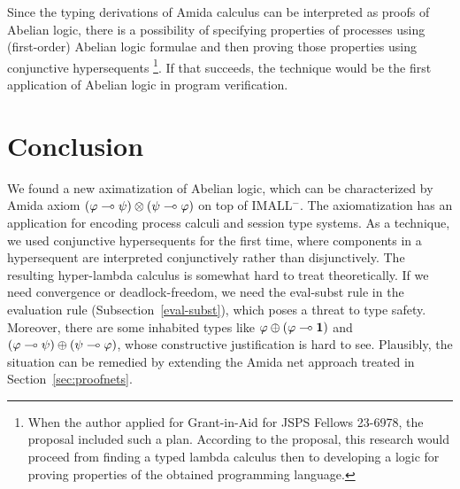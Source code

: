 Since the typing derivations of Amida calculus can be interpreted as
proofs of Abelian logic, there is a possibility of specifying properties
of processes using (first-order) Abelian logic formulae and then
proving those properties using conjunctive hypersequents%
\footnote{When the author applied for Grant-in-Aid for JSPS Fellows
23-6978, the proposal included such a plan.  According to the proposal,
this research would proceed from finding a typed lambda calculus then to
developing a logic for proving properties of the obtained programming
language.}.
If that succeeds, the technique would be the first application of
Abelian logic in program verification.

\section{Conclusion}

We found a new aximatization of Abelian logic, which can be
characterized by Amida axiom
$(\varphi\multimap\psi)\otimes(\psi\multimap\varphi)$ on top of IMALL$^-$.
The axiomatization has an application for encoding process calculi and
session type systems.
As a technique, we used conjunctive hypersequents for the first time,
where components in a hypersequent are interpreted conjunctively rather
than disjunctively.
The resulting hyper-lambda calculus is somewhat hard to treat
theoretically.
If we need convergence or deadlock-freedom, we need the eval-subst rule in the evaluation rule
(Subsection~\ref{eval-subst}),
which poses a threat to type safety.
Moreover, there are some inhabited types like $\varphi\oplus
(\varphi\multimap\mathbf{1})$ and $(\varphi\multimap\psi)\oplus(\psi\multimap\varphi)$,
whose constructive justification is hard to see.
Plausibly, the situation can be remedied by extending the Amida net
approach treated in Section~\ref{sec:proofnets}.
